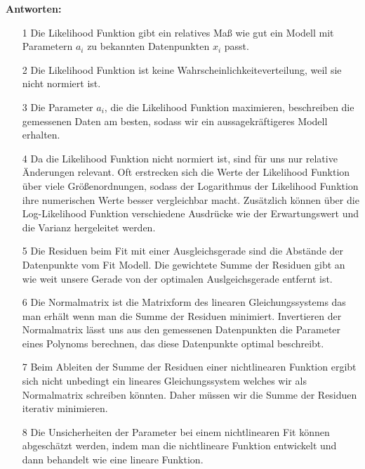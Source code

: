 \begin{tcolorbox}[enhanced,width=6in,
    fontupper=\small,drop fuzzy shadow southwest,
    colframe=black!50!black,colback=black!5]
\textbf{Antworten:} \\
\begin{enumerate}
\item[1] Die Likelihood Funktion gibt ein relatives Maß wie gut ein Modell mit Parametern $a_i$ zu bekannten Datenpunkten $x_i$ passt.
\item[2] Die Likelihood Funktion ist keine Wahrscheinlichkeiteverteilung, weil sie nicht normiert ist. 
\item[3] Die Parameter $a_i$, die die Likelihood Funktion maximieren, beschreiben die gemessenen Daten am besten, sodass wir ein aussagekräftigeres Modell erhalten. 
\item[4] Da die Likelihood Funktion nicht normiert ist, sind für uns nur relative Änderungen relevant. Oft erstrecken sich die Werte der Likelihood Funktion über viele Größenordnungen, sodass der Logarithmus der Likelihood Funktion ihre numerischen Werte besser vergleichbar macht. Zusätzlich können über die Log-Likelihood Funktion verschiedene Ausdrücke wie der Erwartungswert und die Varianz hergeleitet werden. 
\item[5] Die Residuen beim Fit mit einer Ausgleichsgerade sind die Abstände der Datenpunkte vom Fit Modell. Die gewichtete Summe der Residuen gibt an wie weit unsere Gerade von der optimalen Auslgeichsgerade entfernt ist.  
\item[6] Die Normalmatrix ist die Matrixform des linearen Gleichungssystems das man erhält wenn man die Summe der Residuen minimiert. Invertieren der Normalmatrix lässt uns aus den gemessenen Datenpunkten die Parameter eines Polynoms berechnen, das diese Datenpunkte optimal beschreibt. 
\item[7] Beim Ableiten der Summe der Residuen einer nichtlinearen Funktion ergibt sich nicht unbedingt ein lineares Gleichungssystem welches wir als Normalmatrix schreiben könnten. Daher müssen wir die Summe der Residuen iterativ minimieren.  
\item[8] Die Unsicherheiten der Parameter bei einem nichtlinearen Fit können abgeschätzt werden, indem man die nichtlineare Funktion entwickelt und dann behandelt wie eine lineare Funktion. 
\end{enumerate}
\end{tcolorbox}